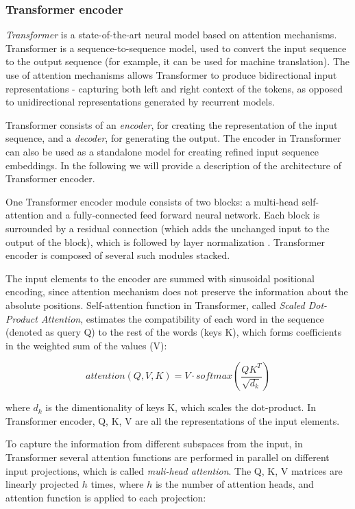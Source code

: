 \subsubsection{Transformer encoder}
\textit{Transformer} \cite{vaswani2017attention} is a state-of-the-art neural model based on attention mechanisms. Transformer is a sequence-to-sequence model, used to convert the input sequence to the output sequence (for example, it can be used for machine translation). The use of attention mechanisms allows Transformer to produce bidirectional input representations - capturing both left and right context of the tokens, as opposed to unidirectional representations generated by recurrent models.

Transformer consists of an \textit{encoder}, for creating the representation of the input sequence, and a \textit{decoder}, for generating the output. The encoder in Transformer can also be used as a standalone model for creating refined input sequence embeddings. In the following we will provide a description of the architecture of Transformer encoder.  

One Transformer encoder module consists of two blocks: a multi-head self-attention and a fully-connected feed forward neural network. Each block is surrounded by a residual connection \cite{he2016deep} (which adds the unchanged input to the output of the block), which is followed by layer normalization \cite{ba2016layer}. Transformer encoder is composed of several such modules stacked.

The input elements to the encoder are summed with sinusoidal positional encoding, since attention mechanism does not preserve the information about the absolute positions. Self-attention function in Transformer, called \textit{Scaled Dot-Product Attention}, estimates the compatibility of each word in the sequence (denoted as query Q) to the rest of the words (keys K), which forms coefficients in the weighted sum of the values (V):

\begin{equation}
    attention(Q,V,K) = V \cdot softmax(\frac{QK^T}{\sqrt{d_k}})
\end{equation}
 
where $d_k$ is the dimentionality of keys K, which scales the dot-product. In Transformer encoder, Q, K, V are all the representations of the input elements.

To capture the information from different subspaces from the input, in Transformer several attention functions are performed in parallel on different input projections, which is called \textit{muli-head attention}. The Q, K, V matrices are linearly projected $h$ times, where $h$ is the number of attention heads, and attention function is applied to each projection:

